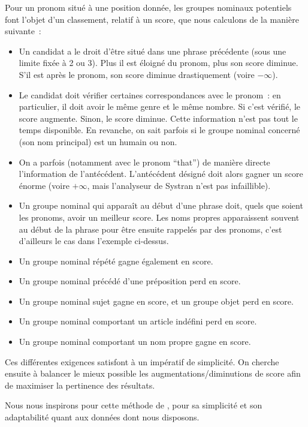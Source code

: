 \documentclass[a4paper, 12pt]{article}
\begin{document}
Pour un pronom situé à une position donnée, les groupes nominaux potentiels font l'objet d'un classement, relatif à un score, que nous calculons de la manière suivante~:

\begin{itemize}
 \item Un candidat a le droit d'être situé dans une phrase précédente (sous une limite fixée à 2 ou 3). Plus il est éloigné du pronom, plus son score diminue. S'il est après le pronom, son score diminue drastiquement (voire $-\infty$).
 \item Le candidat doit vérifier certaines correspondances avec le pronom~: en particulier, il doit avoir le même genre et le même nombre. Si c'est vérifié, le score augmente. Sinon, le score diminue. Cette information n'est pas tout le temps disponible. En revanche, on sait parfois si le groupe nominal concerné (son nom principal) est un humain ou non.
 \item On a parfois (notamment avec le pronom ``that'') de manière directe l'information de l'antécédent. L'antécédent désigné doit alors gagner un score énorme (voire $+\infty$, mais l'analyseur de Systran n'est pas infaillible).
 \item Un groupe nominal qui apparaît au début d'une phrase doit, quels que soient les pronoms, avoir un meilleur score. Les noms propres apparaissent souvent au début de la phrase pour être ensuite rappelés par des pronoms, c'est d'ailleurs le cas dans l'exemple ci-dessus.
 \item Un groupe nominal répété gagne également en score.
 \item Un groupe nominal précédé d'une préposition perd en score.
 \item Un groupe nominal sujet gagne en score, et un groupe objet perd en score. 
 \item Un groupe nominal comportant un article indéfini perd en score.
 \item Un groupe nominal comportant un nom propre gagne en score.
\end{itemize}

Ces différentes exigences satisfont à un impératif de simplicité. On cherche ensuite à balancer le mieux possible les augmentations/diminutions de score afin de maximiser la pertinence des résultats.

Nous nous inspirons pour cette méthode de \cite{Mitkov:1998:RPR:980691.980712}, pour sa simplicité et son adaptabilité quant aux données dont nous disposons.
\end{document}
